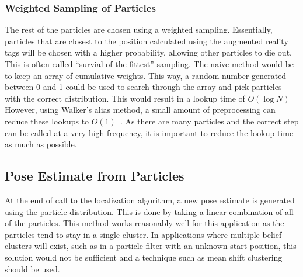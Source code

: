 		\subsubsection{Weighted Sampling of Particles}

			The rest of the particles are chosen using a weighted sampling. Essentially, particles that are closest to the position calculated using the augmented reality tags will be chosen with a higher probability, allowing other particles to die out. This is often called ``survial of the fittest'' sampling. The naive method would be to keep an array of cumulative weights. This way, a random number generated between 0 and 1 could be used to search through the array and pick particles with the correct distribution. This would result in a lookup time of $O(\log{N})$ However, using Walker's alias method, a small amount of preprocessing can reduce these lookups to $O(1)$~\cite{Walker}. As there are many particles and the correct step can be called at a very high frequency, it is important to reduce the lookup time as much as possible.

	\subsection{Pose Estimate from Particles}
		At the end of call to the localization algorithm, a new pose estimate is generated using the particle distribution. This is done by taking a linear combination of all of the particles. This method works reasonably well for this application as the particles tend to stay in a single cluster. In applications where multiple belief clusters will exist, such as in a particle filter with an unknown start position, this solution would not be sufficient and a technique such as mean shift clustering should be used. 


